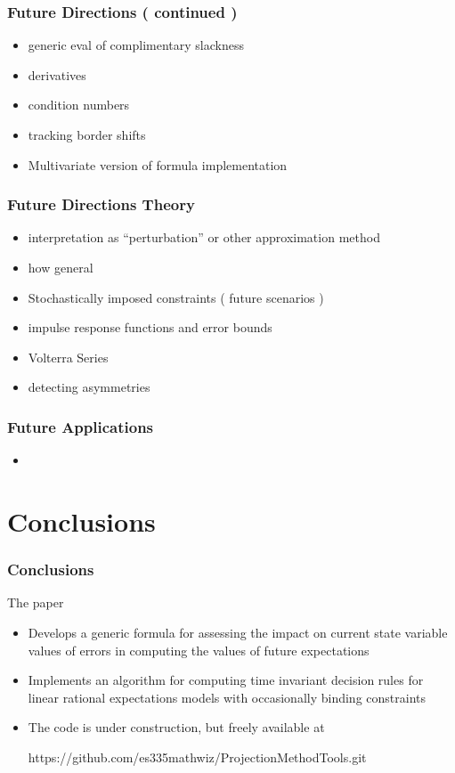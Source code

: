 \documentclass{beamer}
\begin{document}
   \begin{frame}
     \frametitle{Future Directions ( continued )}
     \begin{itemize}
 \item generic eval of complimentary slackness
 \item derivatives
 \item condition numbers
 \item tracking border shifts
 \item Multivariate version of formula implementation
     \end{itemize}
   \end{frame}

   \begin{frame}
     \frametitle{Future Directions Theory}
     \begin{itemize}
  \item interpretation as ``perturbation'' or other approximation method
 \item how general
 \item Stochastically imposed constraints ( future scenarios )
 \item impulse response functions and error bounds
 \item Volterra Series
 \item detecting asymmetries
     \end{itemize}
   \end{frame}
   \begin{frame}
   \frametitle{Future Applications}
     \begin{itemize}
 \item
     \end{itemize}
   \end{frame}




    \section{Conclusions}

  \begin{frame}
    \frametitle{Conclusions}

The paper 

    \begin{itemize}
\item Develops a generic formula  for assessing the impact on current state variable values of errors in computing the values of future expectations
    \item Implements an algorithm for computing time invariant 
decision rules for linear rational expectations models with occasionally binding constraints
\item The code is under construction, but freely available at 

https://github.com/es335mathwiz/ProjectionMethodTools.git
    \end{itemize}
  \end{frame}
\end{document}
